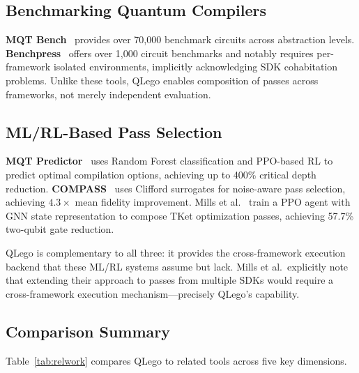 \documentclass[conference]{IEEEtran}
\begin{document}
\subsection{Benchmarking Quantum Compilers}

\textbf{MQT Bench}~\cite{quetschlich2023mqtbench} provides over 70,000 benchmark circuits across abstraction levels.
\textbf{Benchpress}~\cite{benchpress} offers over 1,000 circuit benchmarks and notably requires per-framework isolated environments, implicitly acknowledging SDK cohabitation problems.
Unlike these tools, QLego enables composition of passes across frameworks, not merely independent evaluation.

\subsection{ML/RL-Based Pass Selection}

\textbf{MQT Predictor}~\cite{quetschlich2022predictor, quetschlich2024mqtpredictor} uses Random Forest classification and PPO-based RL to predict optimal compilation options, achieving up to 400\% critical depth reduction.
\textbf{COMPASS}~\cite{dangwal2024compass} uses Clifford surrogates for noise-aware pass selection, achieving $4.3\times$ mean fidelity improvement.
Mills et al.~\cite{mills2026rl} train a PPO agent with GNN state representation to compose TKet optimization passes, achieving 57.7\% two-qubit gate reduction.

QLego is complementary to all three: it provides the cross-framework execution backend that these ML/RL systems assume but lack.
Mills et al.\ explicitly note that extending their approach to passes from multiple SDKs would require a cross-framework execution mechanism---precisely QLego's capability.

\subsection{Comparison Summary}

Table~\ref{tab:relwork} compares QLego to related tools across five key dimensions.
\end{document}
